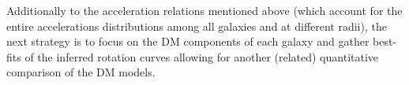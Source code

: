 Additionally to the acceleration relations mentioned above (which account for the entire accelerations distributions among all galaxies and at different radii), the next strategy is to focus on the DM components of each galaxy and gather best-fits of the inferred rotation curves allowing for another (related) quantitative comparison of the DM models.
